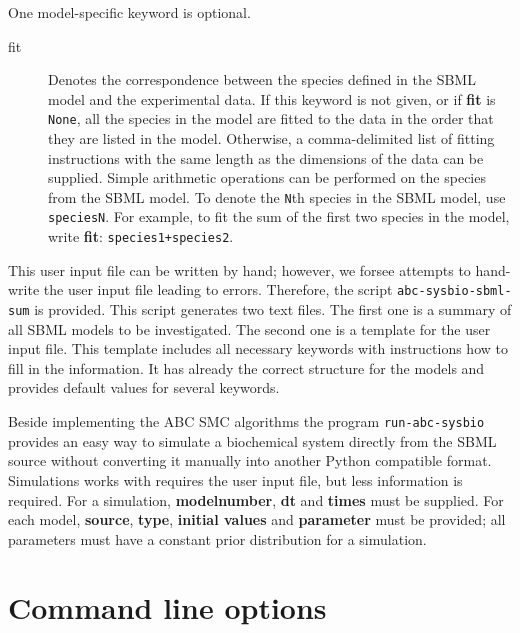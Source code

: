 \documentclass[a4paper]{report}
\begin{document}
One model-specific keyword is optional.
\begin{description}
\item[fit] Denotes the correspondence between the species defined in the SBML model and the experimental data. If this keyword is not given, or if \textbf{fit} is \verb$None$, all the species in the model are fitted to the data in the order that they are listed in the model. Otherwise, a comma-delimited list of fitting instructions with the same length as the dimensions of the data can be supplied. Simple arithmetic operations can be performed on the species from the SBML model. To denote the \verb$N$th species in the SBML model, use \verb$speciesN$. For example, to fit the sum of the first two species in the model, write \textbf{fit}: \verb$species1+species2$.
\end{description}
This user input file can be written by hand; however, we forsee attempts to hand-write the user input file leading to errors. Therefore, the script \verb$abc-sysbio-sbml-sum$ is provided. This script generates two text files. The first one is a summary of all SBML models to be investigated. The second one is a template for the user input file. This template includes all necessary keywords with instructions how to fill in the information. It has already the correct structure for the models and provides default values for several keywords.

Beside implementing the ABC SMC algorithms the program \verb$run-abc-sysbio$ provides an easy way to simulate a biochemical system directly from  the SBML source without converting it manually into another Python compatible format. Simulations works with requires the user input file, but less information is required. For a simulation, \textbf{modelnumber}, \textbf{dt} and \textbf{times} must be supplied. For each model, \textbf{source}, \textbf{type}, \textbf{initial values} and \textbf{parameter} must be provided; all parameters must have a constant prior distribution for a simulation.

\section{Command line options}
\end{document}
